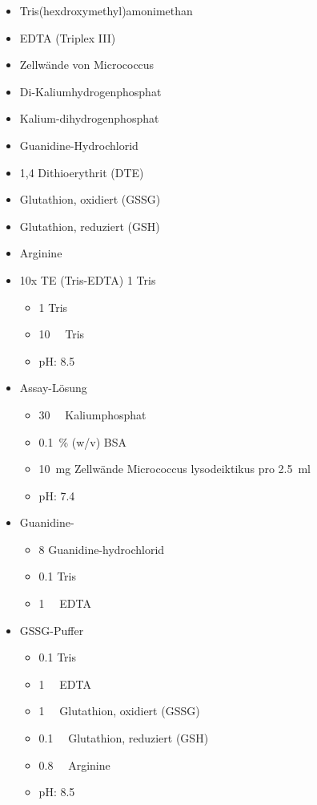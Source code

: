 \documentclass[a4paper,german]{scrreprt}
\begin{document}
\begin{itemize}
	\item Tris(hexdroxymethyl)amonimethan
	\item EDTA (Triplex III)
	\item Zellwände von Micrococcus
	\item Di-Kaliumhydrogenphosphat
	\item Kalium-dihydrogenphosphat
	\item Guanidine-Hydrochlorid
	\item 1,4 Dithioerythrit (DTE)
	\item Glutathion, oxidiert (GSSG)
	\item Glutathion, reduziert (GSH)
	\item Arginine

	\item 10x TE (Tris-EDTA) \SI{1}{\Molar} Tris
	\begin{itemize}
		\item \SI{1}{\Molar} Tris
		\item \SI{10}{\milli\Molar} Tris
		\item pH: 8.5
	\end{itemize}

	\item Assay-Lösung
	\begin{itemize}
		\item \SI{30}{\milli\Molar} Kaliumphosphat
		\item \SI{0.1}{\percent} (w/v) BSA
		\item \SI{10}{mg} Zellwände Micrococcus lysodeiktikus pro \SI{2.5}{ml}
		\item pH: 7.4
	\end{itemize}

	\item Guanidine-
	\begin{itemize}
		\item \SI{8}{\Molar} Guanidine-hydrochlorid
		\item \SI{0.1}{\Molar} Tris
		\item \SI{1}{\milli\Molar} EDTA
	\end{itemize}
	\item GSSG-Puffer
	\begin{itemize}
		\item \SI{0.1}{\Molar} Tris
		\item \SI{1}{\milli\Molar} EDTA
		\item \SI{1}{\milli\Molar} Glutathion, oxidiert (GSSG)
		\item \SI{0.1}{\milli\Molar} Glutathion, reduziert (GSH)
		\item \SI{0.8}{\milli\Molar} Arginine
		\item pH: 8.5
	\end{itemize}
\end{itemize}
\end{document}
